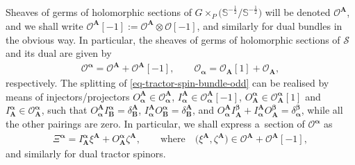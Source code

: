 \documentclass[pdftex]{sigma}
\numberwithin{equation}{section}
\newcommand{\mbf} [1]{\mathbf{#1}}
\newcommand{\mc} [1]{\mathcal{#1}}
\newcommand{\Ss} {\mathbb{S}}
\begin{document}
Sheaves of germs of holomorphic sections of $G \times_P \big( \Ss^{-\frac{1}{2}} / \Ss^{-\frac{1}{2}}\big)$ will be denoted $\mc{O}^{\mbf{A}}$, and we shall write $\mc{O}^{\mbf{A}} [-1]:= \mc{O}^{\mbf{A}} \otimes \mc{O} [-1]$, and similarly for dual bundles in the obvious way. In particular, the sheaves of germs of holomorphic sections of $\mc{S}$ and its dual are given by
\begin{gather}\label{eq-tractor-spin-bundle-odd}
\mc{O}^{\bm{\upalpha}} = \mc{O}^{\mbf{A}} + \mc{O}^{\mbf{A}} [-1] , \qquad
\mc{O}_{\bm{\upalpha}} = \mc{O}_{\mbf{A}} [1] + \mc{O}_{\mbf{A}} ,
\end{gather}
respectively. The splitting of \eqref{eq-tractor-spin-bundle-odd} can be realised by means of injectors/projectors $O_{\bm{\upalpha}}^{\mbf{A}} \in \mc{O}_{\bm{\upalpha}}^{\mbf{A}}$, $I_{\bm{\upalpha}}^{\mbf{A}} \in \mc{O}_{\bm{\upalpha}}^{\mbf{A}} [-1]$, $O^{\bm{\upalpha}}_{\mbf{A}} \in \mc{O}^{\bm{\upalpha}}_{\mbf{A}} [1]$ and $I^{\bm{\upalpha}}_{\mbf{A}} \in \mc{O}^{\bm{\upalpha}}_{\mbf{A}}$, such that $O_{\bm{\upalpha}}^{\mbf{A}} I^{\bm{\upalpha}}_{\mbf{B}} = \delta_{\mbf{B}}^{\mbf{A}}$, $I_{\bm{\upalpha}}^{\mbf{A}} O^{\bm{\upalpha}}_{\mbf{B}} = \delta_{\mbf{B}}^{\mbf{A}}$, and $O_{\bm{\upalpha}}^{\mbf{A}} I_{\mbf{A}}^{\bm{\upbeta}} + I_{\bm{\upalpha}}^{\mbf{A}} O_{\mbf{A}}^{\bm{\upbeta}} = \delta_{\bm{\upalpha}}^{\bm{\upbeta}}$, while all the other pairings are zero. In particular, we shall express a~section of $\mc{O}^{\bm{\upalpha}}$ as
\begin{gather*}
\Xi^{\bm{\upalpha}} = I^{\bm{\upalpha}}_{\mbf{A}} \xi^{\mbf{A}} + O^{\bm{\upalpha}}_{\mbf{A}} \zeta^{\mbf{A}} , \qquad \text{where} \quad \big(\xi^{\mbf{A}} , \zeta^{\mbf{A}}\big) \in \mc{O}^{\mbf{A}} + \mc{O}^{\mbf{A}} [-1],
\end{gather*}
and similarly for dual tractor spinors.
\end{document}
